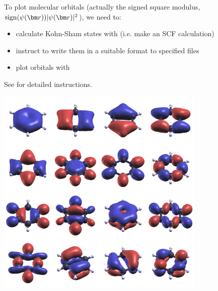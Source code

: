 \documentclass[landscape]{foils}
\begin{document}
To plot molecular orbitals (actually the signed square modulus,
$\sign(\psi(\vr))|\psi(\vr)|^2$), we need to:
\begin{itemize}
\item calculate Kohn-Sham states with  (i.e. make an
  SCF calculation)
\item instruct  to write them in a suitable format to
  specified files
\item plot orbitals with 
\end{itemize}
See  for detailed instructions.
\vspace{-4cm}
\begin{flushright}
  \includegraphics[width=10cm]{figs/psi2-benzene.png}  
\end{flushright}

\end{document}
